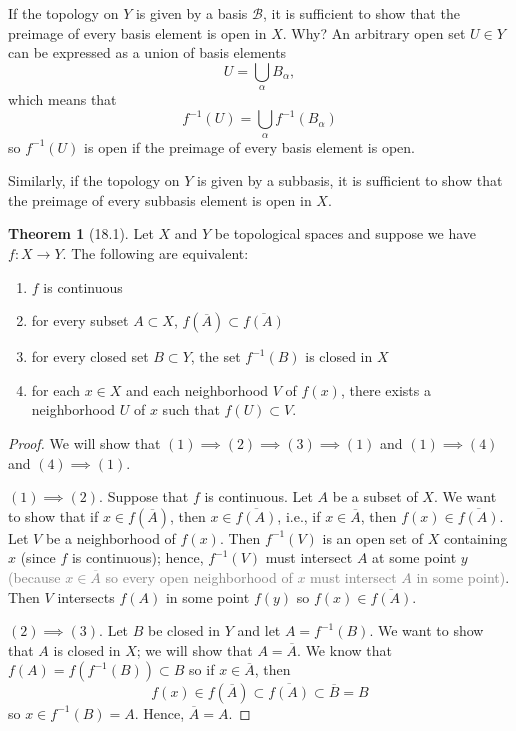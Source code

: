 \documentclass{article}
\newcommand{\nline}{\vspace*{0.5\baselineskip}}
\newcommand{\com}[1]{\textcolor{grey}{#1}}
\theoremstyle{definition}
\newtheorem{theorem}{Theorem}[subsection]
\begin{document}
\begin{flushleft}
If the topology on $Y$ is given by a basis $\mathcal{B}$, it is sufficient to show that the preimage of every basis element is open in $X$. Why? An arbitrary open set $U \in Y$ can be expressed as a union of basis elements
\[
U = \bigcup_{\alpha} B_\alpha,
\]
which means that
\[
f^{-1}(U) = \bigcup_{\alpha} f^{-1}(B_\alpha)
\]
so $f^{-1}(U)$ is open if the preimage of every basis element is open.

\nline

Similarly, if the topology on $Y$ is given by a subbasis, it is sufficient to show that the preimage of every subbasis element is open in $X$.

\begin{theorem}[18.1]
Let $X$ and $Y$ be topological spaces and suppose we have $f : X \to Y$. The following are equivalent:
\begin{enumerate}
    \item $f$ is continuous
    \item for every subset $A \subset X$, $f(\overline{A}) \subset \overline{f(A)}$
    \item for every closed set $B \subset Y$, the set $f^{-1}(B)$ is closed in $X$
    \item for each $x \in X$ and each neighborhood $V$ of $f(x)$, there exists a neighborhood $U$ of $x$ such that $f(U) \subset V$.
\end{enumerate}
\end{theorem}

\begin{proof}
We will show that $(1) \implies (2) \implies (3) \implies (1)$ and $(1) \implies (4)$ and $(4) \implies (1)$.

\nline

$(1) \implies (2)$. Suppose that $f$ is continuous. Let $A$ be a subset of $X$. We want to show that if $x \in f(\overline{A})$, then $x \in \overline{f(A)}$, i.e., if $x \in \overline{A}$, then $f(x) \in \overline{f(A)}$. Let $V$ be a neighborhood of $f(x)$. Then $f^{-1}(V)$ is an open set of $X$ containing $x$ (since $f$ is continuous); hence, $f^{-1}(V)$ must intersect $A$ at some point $y$ \com{(because $x \in \overline{A}$ so every open neighborhood of $x$ must intersect $A$ in some point)}. Then $V$ intersects $f(A)$ in some point $f(y)$ so $f(x) \in \overline{f(A)}$.

\nline

$(2) \implies (3)$. Let $B$ be closed in $Y$ and let $A = f^{-1}(B)$. We want to show that $A$ is closed in $X$; we will show that $A = \overline{A}$. We know that $f(A) = f(f^{-1}(B)) \subset B$ so if $x \in \overline{A}$, then
\[
f(x) \in f(\overline{A}) \subset \overline{f(A)} \subset \overline{B} = B
\]
so $x \in f^{-1}(B) = A$. Hence, $\overline{A} = A$.


\end{proof}
\end{flushleft}
\end{document}
